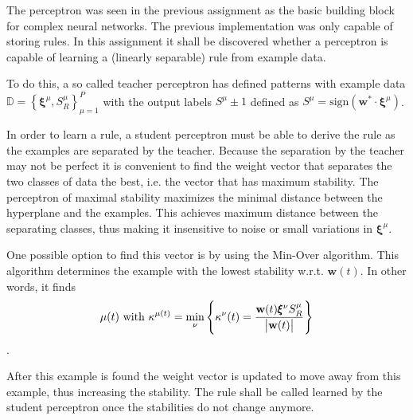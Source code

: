 The perceptron was seen in the previous assignment as the basic building block for complex neural networks. The previous implementation was only capable of storing rules. In this assignment it shall be discovered whether a perceptron is capable of learning a (linearly separable) rule from example data. 

To do this, a so called teacher perceptron has defined patterns with example data $\mathbb{D} = \left\{ \pmb{\xi}^\mu, S^\mu_{R} \right\} _{\mu=1}^{P}$
 with the output labels $S^\mu \pm 1$ defined as $S^\mu = \mbox{sign}(\mathbf{w}^{*} \cdot \pmb{\xi}^\mu)$. 

In order to learn a rule, a student perceptron must be able to derive the rule as the examples are separated by the teacher. Because the separation by the teacher may not be perfect it is convenient to find the weight vector that separates the two classes of data the best, i.e. the vector that has maximum stability. The perceptron of maximal stability maximizes the minimal distance between the hyperplane and the examples\cite{perceptron_slides2}. This achieves maximum distance between the separating classes, thus making it insensitive to noise or small variations in $\pmb{\xi}^\mu$.

One possible option to find this vector is by using the Min-Over algorithm. This algorithm determines the example with the lowest stability w.r.t. $\mathbf{w}(t)$. In other words, it finds 
\[ 
\mu(t)\mbox{ with } \kappa^{\mu(t)} = \underset{\nu}{\mbox{min}} 
\left\{
\kappa^\nu(t) = \frac{\mathbf{w}(t)\pmb{\xi}^{\nu} S^{\mu}_R}{\mbox{\big|}\mathbf{w}(t)\mbox{\big|}} 
\right\}
\].

After this example is found the weight vector is updated to move away from this example, thus increasing the stability. The rule shall be called learned by the student perceptron once the stabilities do not change anymore.